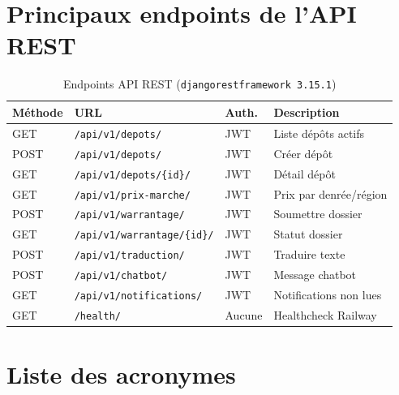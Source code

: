 \documentclass[12pt,a4paper,twoside]{report}
\begin{document}
\chapter{Principaux endpoints de l'API REST}
\label{ann:api}

\begin{table}[H]
\centering
\caption{Endpoints API REST (\texttt{djangorestframework 3.15.1})}
\label{tab:api_endpoints}
\begin{tabular}{L{1.5cm}L{5.5cm}L{3cm}L{4cm}}
\toprule
\textbf{Méthode} & \textbf{URL} & \textbf{Auth.} & \textbf{Description} \\
\midrule
GET  & \texttt{/api/v1/depots/}              & JWT   & Liste dépôts actifs \\
POST & \texttt{/api/v1/depots/}              & JWT   & Créer dépôt \\
GET  & \texttt{/api/v1/depots/\{id\}/}      & JWT   & Détail dépôt \\
GET  & \texttt{/api/v1/prix-marche/}         & JWT   & Prix par denrée/région \\
POST & \texttt{/api/v1/warrantage/}          & JWT   & Soumettre dossier \\
GET  & \texttt{/api/v1/warrantage/\{id\}/}  & JWT   & Statut dossier \\
POST & \texttt{/api/v1/traduction/}          & JWT   & Traduire texte \\
POST & \texttt{/api/v1/chatbot/}             & JWT   & Message chatbot \\
GET  & \texttt{/api/v1/notifications/}       & JWT   & Notifications non lues \\
GET  & \texttt{/health/}                     & Aucune & Healthcheck Railway \\
\bottomrule
\end{tabular}
\end{table}

\chapter{Liste des acronymes}
\label{ann:acronymes}
\end{document}

